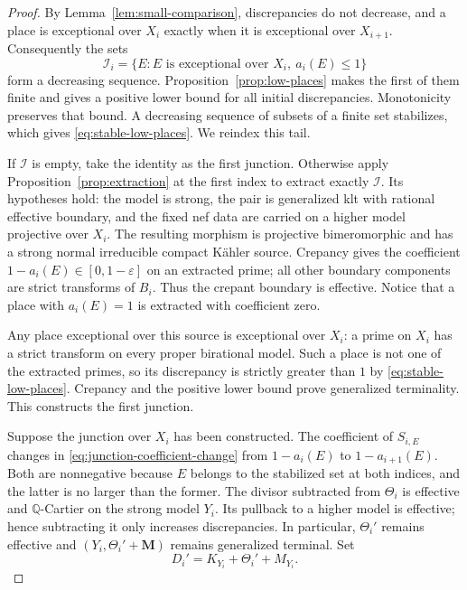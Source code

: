 \documentclass[11pt]{amsart}
\theoremstyle{definition}
\theoremstyle{remark}
\numberwithin{equation}{section}
\newcommand{\Q}{\mathbb{Q}}
\newcommand{\M}{\mathbf{M}}
\begin{document}
\begin{proof}
By Lemma~\ref{lem:small-comparison}, discrepancies do not decrease, and a
place is exceptional over $X_i$ exactly when it is exceptional over
$X_{i+1}$.  Consequently the sets
\[
 \mathcal I_i=\{E:E\text{ is exceptional over }X_i,\ a_i(E)\leq1\}
\]
form a decreasing sequence.  Proposition~\ref{prop:low-places} makes the
first of them finite and gives a positive lower bound for all initial
discrepancies.  Monotonicity preserves that bound.  A decreasing sequence
of subsets of a finite set stabilizes, which gives
\eqref{eq:stable-low-places}.  We reindex this tail.

If $\mathcal I$ is empty, take the identity as the first junction.
Otherwise apply Proposition~\ref{prop:extraction} at the first index to
extract exactly $\mathcal I$.  Its hypotheses hold: the model is strong,
the pair is generalized klt with rational effective boundary, and the
fixed nef data are carried on a higher model projective over $X_i$.
The resulting morphism is projective bimeromorphic and has a strong normal
irreducible compact K\"ahler source.  Crepancy gives the coefficient
$1-a_i(E)\in[0,1-\varepsilon]$ on an extracted prime; all other boundary
components are strict transforms of $B_i$.  Thus the crepant boundary is
effective.  Notice that a place with $a_i(E)=1$ is extracted with coefficient
zero.

Any place exceptional over this source is exceptional over $X_i$: a prime
on $X_i$ has a strict transform on every proper birational model.  Such a
place is not one of the extracted primes, so its discrepancy is strictly
greater than $1$ by \eqref{eq:stable-low-places}.  Crepancy and the positive
lower bound prove generalized terminality.  This constructs the first
junction.

Suppose the junction over $X_i$ has been constructed.  The coefficient of
$S_{i,E}$ changes in \eqref{eq:junction-coefficient-change} from
$1-a_i(E)$ to $1-a_{i+1}(E)$.  Both are nonnegative because $E$ belongs to
the stabilized set at both indices, and the latter is no larger than the
former.  The divisor subtracted from $\Theta_i$ is effective and
$\Q$-Cartier on the strong model $Y_i$.  Its pullback to a higher model is
effective; hence subtracting it only increases discrepancies.  In
particular, $\Theta_i'$ remains effective and
$(Y_i,\Theta_i'+\M)$ remains generalized terminal.  Set
\[
                    D_i'=K_{Y_i}+\Theta_i'+M_{Y_i}.
\]


\end{proof}
\end{document}
